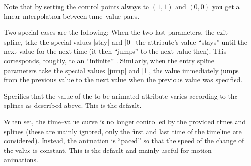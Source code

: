 \begin{command}{\pgfsys@animation@time{}}
  Note that by setting the control points always to $(1,1)$ and
  $(0,0)$ you get a linear interpolation between time--value pairs.

  Two special cases are the following: When the two last parameters,
  the exit spline, take the special values |stay| and |0|, the
  attribute's value ``stays'' until the next value for the next time
  (it then ``jumps'' to the next value then). This corresponds,
  roughly, to an ``infinite'' .
  Similarly, when the entry spline parameters take the special values
  |jump| and |1|, the value immediately jumps from the previous value to
  the next value when the previous value was specified.
  
  \begin{command}{\pgfsys@animation@spline}
    Specifies that the value of the to-be-animated attribute varies
    according to the splines as described above. This is the default.
\begin{codeexample}[width=2cm]
\end{codeexample}
  \end{command}

  \begin{command}{\pgfsys@animation@paced}
    When set, the time--value curve is no longer controlled by the
    provided times and splines (these are mainly ignored, only the
    first and last time of the timeline are considered). Instead, the
    animation is ``paced'' so that the speed of the change of the
    value is constant. This is the default and mainly useful for
    motion animations. 
\begin{codeexample}[width=2cm]
\end{codeexample}
  \end{command}
 
\end{command}


